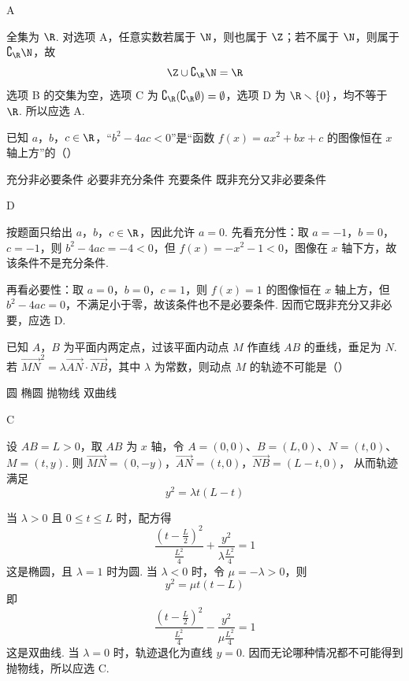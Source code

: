 \begin{answer}
A
\end{answer}

\begin{solution}
全集为 \(\R\). 对选项 A，任意实数若属于 \(\N\)，则也属于 \(\Z\)；若不属于 \(\N\)，则属于 \(\complement_{\R}\N\)，故
\[
\Z\cup\complement_{\R}\N=\R
\]
选项 B 的交集为空，选项 C 为 \(\complement_{\R}(\complement_{\R}\emptyset)=\emptyset\)，选项 D 为 \(\R\smallsetminus\{0\}\)，均不等于 \(\R\). 所以应选 A.
\end{solution}

\begin{problem}
已知 \( a \)，\( b \)，\( c \in \R \)，“\( b^2 - 4ac < 0 \)”是“函数 \( f(x) = ax^2 + bx + c \) 的图像恒在 \( x \) 轴上方”的（\quad）

\choices
    {充分非必要条件}
    {必要非充分条件}
    {充要条件}
    {既非充分又非必要条件}
\end{problem}

\begin{answer}
D
\end{answer}

\begin{solution}
按题面只给出 \(a\)，\(b\)，\(c\in\R\)，因此允许 \(a=0\). 先看充分性：取 \(a=-1\)，\(b=0\)，\(c=-1\)，则
\(b^2-4ac=-4<0\)，但 \(f(x)=-x^2-1<0\)，图像在 \(x\) 轴下方，故该条件不是充分条件.

再看必要性：取 \(a=0\)，\(b=0\)，\(c=1\)，则 \(f(x)=1\) 的图像恒在 \(x\) 轴上方，但 \(b^2-4ac=0\)，不满足小于零，故该条件也不是必要条件. 因而它既非充分又非必要，应选 D.
\end{solution}

\begin{problem}
已知 \(A\)，\(B\) 为平面内两定点，过该平面内动点 \(M\) 作直线 \(AB\) 的垂线，垂足为 \(N\). 若 \( \overrightarrow{MN}^{2} = \lambda \overrightarrow{AN} \cdot \overrightarrow{NB} \)，其中 \( \lambda \) 为常数，则动点 \(M\) 的轨迹不可能是（\quad）

\choices
    {圆}
    {椭圆}
    {抛物线}
    {双曲线}
\end{problem}

\begin{answer}
C
\end{answer}

\begin{solution}
设 \(AB=L>0\)，取 \(AB\) 为 \(x\) 轴，令 \(A=(0,0)\)、\(B=(L,0)\)、\(N=(t,0)\)、\(M=(t,y)\). 则
\(\overrightarrow{MN}=(0,-y)\)，\(\overrightarrow{AN}=(t,0)\)，\(\overrightarrow{NB}=(L-t,0)\)，
从而轨迹满足
\[
y^2=\lambda t(L-t)
\]

当 \(\lambda>0\) 且 \(0\le t\le L\) 时，配方得
\[
\frac{(t-\frac{L}{2})^2}{\frac{L^2}{4}}+\frac{y^2}{\lambda \frac{L^2}{4}}=1
\]
这是椭圆，且 \(\lambda=1\) 时为圆. 当 \(\lambda<0\) 时，令 \(\mu=-\lambda>0\)，则
\[
y^2=\mu t(t-L)
\]
即
\[
\frac{(t-\frac{L}{2})^2}{\frac{L^2}{4}}-\frac{y^2}{\mu \frac{L^2}{4}}=1
\]
这是双曲线. 当 \(\lambda=0\) 时，轨迹退化为直线 \(y=0\). 因而无论哪种情况都不可能得到抛物线，所以应选 C.
\end{solution}

